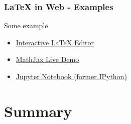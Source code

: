 \documentclass[slidestop,compress,mathserif]{beamer}
\begin{document}
		\begin{frame} \frametitle{LaTeX in Web - Examples}
			Some example\\
			
			\begin{itemize}
				\item \href{http://arachnoid.com/latex/}{Interactive LaTeX Editor}
				\item \href{https://github.com/mathjax/MathJax/blob/master/test/sample-dynamic-2.html}{MathJax Live Demo}
				\item \href{https://ipython.org/ipython-doc/3/install/install.html\#mathjax}{Jupyter Notebook (former IPython)}
			\end{itemize}
			
		\end{frame}

\section[Summary]{Summary}

\end{document}
